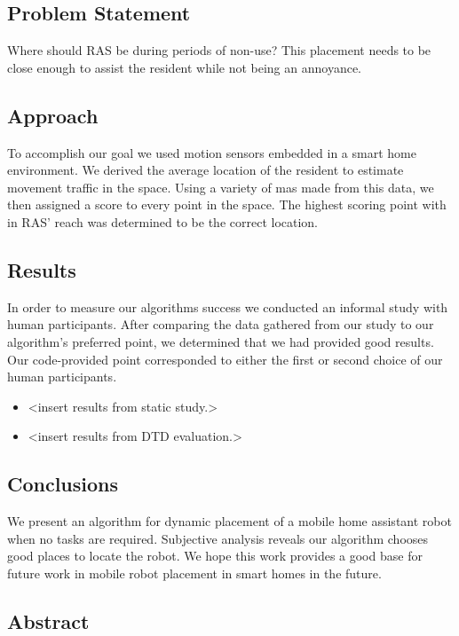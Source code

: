 \documentclass[11pt, conference, a4paper]{IEEEtran}
\begin{document}
\subsection{Problem Statement}
Where should RAS be during periods of non-use? This placement needs to be close enough to assist the resident while not being an annoyance. 


\subsection{Approach}
To accomplish our goal we used motion sensors embedded in a smart home environment. We derived the average location of the resident to estimate movement traffic in the space. Using a variety of mas made from this data, we then assigned a score to every point in the space. The highest scoring point with in RAS' reach was determined to be the correct location. 


\subsection{Results}
In order to measure our algorithms success we conducted an informal study with human participants. After comparing the data gathered from our study to our algorithm's preferred point, we determined that we had provided good results. Our code-provided point corresponded to either the first or second choice of our human participants.
\begin{itemize}
    \item \textless insert results from static study.\textgreater 
    \item \textless insert results from DTD evaluation.\textgreater
\end{itemize}



\subsection{Conclusions}
We present an algorithm for dynamic placement of a mobile home assistant robot 
when no tasks are required. Subjective analysis reveals our algorithm chooses 
good places to locate the robot. We hope this work provides a good base for 
future work in mobile robot placement in smart homes in the future.


\subsection{Abstract}
\end{document}
